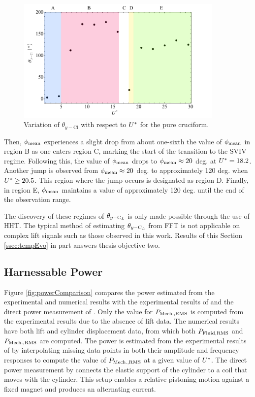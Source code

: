 \documentclass[oneside]{utmthesis}
\begin{document}
\begin{figure}[H]
  \centering
  \hspace{1cm} \includegraphics[width=0.9\textwidth]{figs/phaseAngleRegime}
  \caption{Variation of $\theta_{y-\text{Cl}}$ with respect to $U^{*}$ for the pure cruciform.}
  \label{fig:phaseAngleRegime}
\end{figure}

Then, $\phi_{\text{mean}}$ experiences a slight drop from about one-sixth the value of $\phi_{\text{mean}}$ in region B as one enters region C, marking the start of the transition to the SVIV regime. Following this, the value of $\phi_{\text{mean}}$ drops to $\phi_{\text{mean}} \approx 20$ deg. at $U^{*} = 18.2$. Another jump is observed from $\phi_{\text{mean}} \approx 20$ deg. to approximately 120 deg. when $U^{*} \geq 20.5$. This region where the jump occurs is designated as region D. Finally, in region E, $\phi_{\text{mean}}$ maintains a value of approximately 120 deg. until the end of the observation range.

The discovery of these regimes of $\theta_{y-\text{C}_{L}}$ is only made possible through the use of HHT. The typical method of estimating $\theta_{y-\text{C}_{L}}$ from FFT is not applicable on complex lift signals such as those observed in this work. Results of this Section \ref{ssec:tempEvo} in part answers thesis objective two.

\subsection{Harnessable Power} \label{ssec:mathModel}

Figure \ref{fig:powerComparison} compares the power estimated from the experimental and numerical results with the experimental results of \citet{Nguyen2012} and the direct power measurement of \citet{Koide2013}. Only the value for $P_{\text{Mech.,RMS}}$ is computed from the experimental results due to the absence of lift data. The numerical results have both lift and cylinder displacement data, from which both $P_{\text{Fluid,RMS}}$ and $P_{\text{Mech.,RMS}}$ are computed. The power is estimated from the experimental results of \citet{Nguyen2012} by interpolating missing data points in both their amplitude and frequency responses to compute the value of $P_{\text{Mech.,RMS}}$ at a given value of $U^{*}$. The direct power measurement by \citet{Koide2013} connects the elastic support of the cylinder to a coil that moves with the cylinder. This setup enables a relative pistoning motion against a fixed magnet and produces an alternating current.
\end{document}
